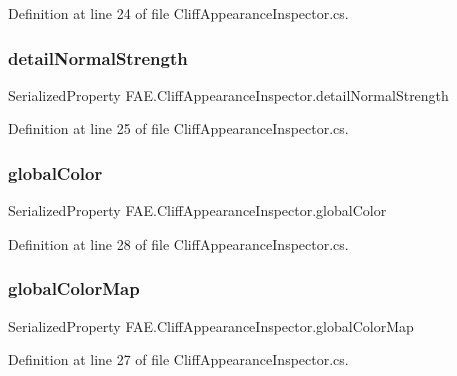 Definition at line 24 of file Cliff\+Appearance\+Inspector.\+cs.

\mbox{\label{class_f_a_e_1_1_cliff_appearance_inspector_a041307acd64286ecea4b3b36b179cf2d}} 
\subsubsection{detail\+Normal\+Strength}
{\footnotesize\ttfamily Serialized\+Property F\+A\+E.\+Cliff\+Appearance\+Inspector.\+detail\+Normal\+Strength}



Definition at line 25 of file Cliff\+Appearance\+Inspector.\+cs.

\mbox{\label{class_f_a_e_1_1_cliff_appearance_inspector_a88df4e4775f1a7903d1543453dab95bc}} 
\subsubsection{global\+Color}
{\footnotesize\ttfamily Serialized\+Property F\+A\+E.\+Cliff\+Appearance\+Inspector.\+global\+Color}



Definition at line 28 of file Cliff\+Appearance\+Inspector.\+cs.

\mbox{\label{class_f_a_e_1_1_cliff_appearance_inspector_a516434ce9e973aa64fa94754faed8414}} 
\subsubsection{global\+Color\+Map}
{\footnotesize\ttfamily Serialized\+Property F\+A\+E.\+Cliff\+Appearance\+Inspector.\+global\+Color\+Map}



Definition at line 27 of file Cliff\+Appearance\+Inspector.\+cs.

